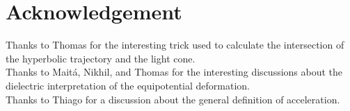 \documentclass[10pt, a4paper]{article}
\begin{document}
\section{Acknowledgement}
Thanks to Thomas for the interesting trick used to calculate the intersection of the hyperbolic trajectory and the light cone.\\

Thanks to Maitá, Nikhil, and Thomas for the interesting discussions about the dielectric interpretation of the equipotential deformation.\\ 

Thanks to Thiago for a discussion about the general definition of acceleration.



\makereferences


\end{document}
